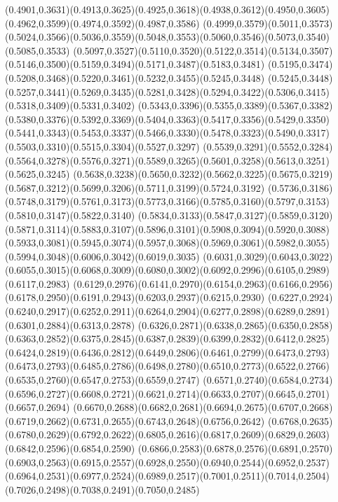 (0.4901,0.3631)(0.4913,0.3625)(0.4925,0.3618)(0.4938,0.3612)(0.4950,0.3605)(0.4962,0.3599)(0.4974,0.3592)(0.4987,0.3586)
(0.4999,0.3579)(0.5011,0.3573)(0.5024,0.3566)(0.5036,0.3559)(0.5048,0.3553)(0.5060,0.3546)(0.5073,0.3540)(0.5085,0.3533)
(0.5097,0.3527)(0.5110,0.3520)(0.5122,0.3514)(0.5134,0.3507)(0.5146,0.3500)(0.5159,0.3494)(0.5171,0.3487)(0.5183,0.3481)
(0.5195,0.3474)(0.5208,0.3468)(0.5220,0.3461)(0.5232,0.3455)(0.5245,0.3448)
\PST@Solid(0.5245,0.3448)(0.5257,0.3441)(0.5269,0.3435)(0.5281,0.3428)(0.5294,0.3422)(0.5306,0.3415)(0.5318,0.3409)(0.5331,0.3402)
(0.5343,0.3396)(0.5355,0.3389)(0.5367,0.3382)(0.5380,0.3376)(0.5392,0.3369)(0.5404,0.3363)(0.5417,0.3356)(0.5429,0.3350)
(0.5441,0.3343)(0.5453,0.3337)(0.5466,0.3330)(0.5478,0.3323)(0.5490,0.3317)(0.5503,0.3310)(0.5515,0.3304)(0.5527,0.3297)
(0.5539,0.3291)(0.5552,0.3284)(0.5564,0.3278)(0.5576,0.3271)(0.5589,0.3265)(0.5601,0.3258)(0.5613,0.3251)(0.5625,0.3245)
(0.5638,0.3238)(0.5650,0.3232)(0.5662,0.3225)(0.5675,0.3219)(0.5687,0.3212)(0.5699,0.3206)(0.5711,0.3199)(0.5724,0.3192)
(0.5736,0.3186)(0.5748,0.3179)(0.5761,0.3173)(0.5773,0.3166)(0.5785,0.3160)(0.5797,0.3153)(0.5810,0.3147)(0.5822,0.3140)
(0.5834,0.3133)(0.5847,0.3127)(0.5859,0.3120)(0.5871,0.3114)(0.5883,0.3107)(0.5896,0.3101)(0.5908,0.3094)(0.5920,0.3088)
(0.5933,0.3081)(0.5945,0.3074)(0.5957,0.3068)(0.5969,0.3061)(0.5982,0.3055)(0.5994,0.3048)(0.6006,0.3042)(0.6019,0.3035)
(0.6031,0.3029)(0.6043,0.3022)(0.6055,0.3015)(0.6068,0.3009)(0.6080,0.3002)(0.6092,0.2996)(0.6105,0.2989)(0.6117,0.2983)
(0.6129,0.2976)(0.6141,0.2970)(0.6154,0.2963)(0.6166,0.2956)(0.6178,0.2950)(0.6191,0.2943)(0.6203,0.2937)(0.6215,0.2930)
(0.6227,0.2924)(0.6240,0.2917)(0.6252,0.2911)(0.6264,0.2904)(0.6277,0.2898)(0.6289,0.2891)(0.6301,0.2884)(0.6313,0.2878)
(0.6326,0.2871)(0.6338,0.2865)(0.6350,0.2858)(0.6363,0.2852)(0.6375,0.2845)(0.6387,0.2839)(0.6399,0.2832)(0.6412,0.2825)
(0.6424,0.2819)(0.6436,0.2812)(0.6449,0.2806)(0.6461,0.2799)(0.6473,0.2793)
\PST@Solid(0.6473,0.2793)(0.6485,0.2786)(0.6498,0.2780)(0.6510,0.2773)(0.6522,0.2766)(0.6535,0.2760)(0.6547,0.2753)(0.6559,0.2747)
(0.6571,0.2740)(0.6584,0.2734)(0.6596,0.2727)(0.6608,0.2721)(0.6621,0.2714)(0.6633,0.2707)(0.6645,0.2701)(0.6657,0.2694)
(0.6670,0.2688)(0.6682,0.2681)(0.6694,0.2675)(0.6707,0.2668)(0.6719,0.2662)(0.6731,0.2655)(0.6743,0.2648)(0.6756,0.2642)
(0.6768,0.2635)(0.6780,0.2629)(0.6792,0.2622)(0.6805,0.2616)(0.6817,0.2609)(0.6829,0.2603)(0.6842,0.2596)(0.6854,0.2590)
(0.6866,0.2583)(0.6878,0.2576)(0.6891,0.2570)(0.6903,0.2563)(0.6915,0.2557)(0.6928,0.2550)(0.6940,0.2544)(0.6952,0.2537)
(0.6964,0.2531)(0.6977,0.2524)(0.6989,0.2517)(0.7001,0.2511)(0.7014,0.2504)(0.7026,0.2498)(0.7038,0.2491)(0.7050,0.2485)
